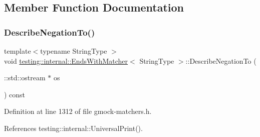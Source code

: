 \subsection{Member Function Documentation}
\mbox{\label{classtesting_1_1internal_1_1EndsWithMatcher_af5dd55c6c3a2ce57bd85f12e07cb604a}} 
\subsubsection{\texorpdfstring{Describe\+Negation\+To()}{DescribeNegationTo()}}
{\footnotesize\ttfamily template$<$typename String\+Type $>$ \\
void \hyperlink{classtesting_1_1internal_1_1EndsWithMatcher}{testing\+::internal\+::\+Ends\+With\+Matcher}$<$ String\+Type $>$\+::Describe\+Negation\+To (\begin{DoxyParamCaption}\item[{\+::std\+::ostream $\ast$}]{os }\end{DoxyParamCaption}) const\hspace{0.3cm}{\ttfamily [inline]}}



Definition at line 1312 of file gmock-\/matchers.\+h.



References testing\+::internal\+::\+Universal\+Print().


